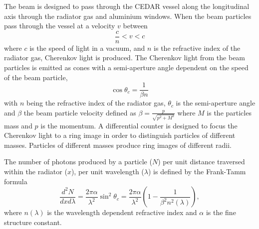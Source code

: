\documentclass[../../main.tex]{subfiles}
\begin{document}
    The beam is designed to pass through the \gls{CEDAR} vessel along the longitudinal axis through the radiator gas and aluminium windows. When the beam particles pass through the vessel at a velocity $v$ between
    \begin{equation}
        \frac{c}{n} < v < c
    \end{equation}
    where $c$ is the speed of light in a vacuum, and $n$ is the refractive index of the radiator gas, Cherenkov light is produced. The Cherenkov light from the beam particles is emitted as cones with a semi-aperture angle dependent on the speed of the beam particle,
    \begin{equation}\label{eq:Cherenkov2}
    \cos{\theta_c} = \frac{1}{\beta n}
    \end{equation}
    with $n$ being the refractive index of the radiator gas, $\theta_c$ is the semi-aperture angle and $\beta$ the beam particle velocity defined as $\beta = \frac{p}{\sqrt{p^2 + M^2}}$ where $M$ is the particles mass and $p$ is the momentum. A differential counter is designed to focus the Cherenkov light to a ring image in order to distinguish particles of different masses. Particles of different masses 
    produce ring images of different radii. 

    The number of photons produced by a particle ($N$) per unit distance traversed within the radiator ($x$), per unit wavelength ($\lambda$) is defined by the Frank-Tamm formula \cite{Frank:1937fk}
    \begin{equation}
        \frac{d^2N}{dxd\lambda} = \frac{2\pi \alpha}{\lambda^2} \sin^2{\theta_c} = \frac{2\pi \alpha}{\lambda^2}\left(1 - \frac{1}{\beta^2 n^2(\lambda)}\right),
    \end{equation}
    where $n(\lambda)$ is the wavelength dependent refractive index and $\alpha$ is the fine structure constant.
\end{document}
